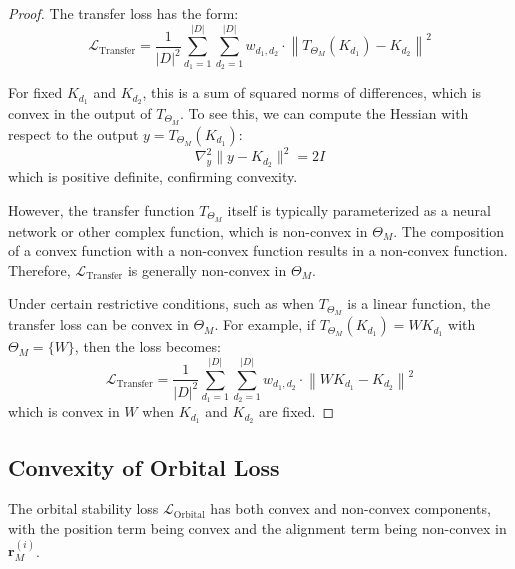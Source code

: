 \begin{proof}
The transfer loss has the form:
\begin{equation}
\mathcal{L}_{\text{Transfer}} = \frac{1}{|D|^2}\sum_{d_1=1}^{|D|} \sum_{d_2=1}^{|D|} w_{d_1,d_2} \cdot \left\|T_{\Theta_M}(K_{d_1}) - K_{d_2}\right\|^2
\end{equation}

For fixed $K_{d_1}$ and $K_{d_2}$, this is a sum of squared norms of differences, which is convex in the output of $T_{\Theta_M}$. To see this, we can compute the Hessian with respect to the output $y = T_{\Theta_M}(K_{d_1})$:
\begin{equation}
\nabla_y^2 \|y - K_{d_2}\|^2 = 2I
\end{equation}
which is positive definite, confirming convexity.

However, the transfer function $T_{\Theta_M}$ itself is typically parameterized as a neural network or other complex function, which is non-convex in $\Theta_M$. The composition of a convex function with a non-convex function results in a non-convex function. Therefore, $\mathcal{L}_{\text{Transfer}}$ is generally non-convex in $\Theta_M$.

Under certain restrictive conditions, such as when $T_{\Theta_M}$ is a linear function, the transfer loss can be convex in $\Theta_M$. For example, if $T_{\Theta_M}(K_{d_1}) = W K_{d_1}$ with $\Theta_M = \{W\}$, then the loss becomes:
\begin{equation}
\mathcal{L}_{\text{Transfer}} = \frac{1}{|D|^2}\sum_{d_1=1}^{|D|} \sum_{d_2=1}^{|D|} w_{d_1,d_2} \cdot \left\|W K_{d_1} - K_{d_2}\right\|^2
\end{equation}
which is convex in $W$ when $K_{d_1}$ and $K_{d_2}$ are fixed.
\end{proof}

\subsection{Convexity of Orbital Loss}

\begin{theorem}
The orbital stability loss $\mathcal{L}_{\text{Orbital}}$ has both convex and non-convex components, with the position term being convex and the alignment term being non-convex in $\mathbf{r}_M^{(i)}$.
\end{theorem}

